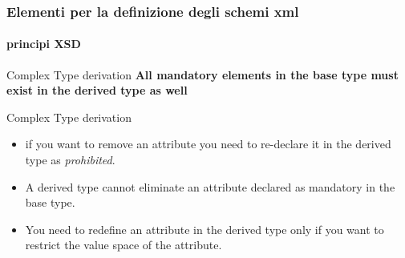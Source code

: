 \begin{frame}
	\frametitle{Elementi per la definizione degli schemi xml}
	\framesubtitle{principi XSD}
	\addtocounter{nframe}{1}

	\begin{block}{Complex Type derivation}
		\textbf{All mandatory elements in the base type must exist in the derived type as well}
	\end{block}

	\begin{block}{Complex Type derivation}
\begin{itemize}
	\item if you want to remove an attribute you need to re-declare it in the derived type as \textit{prohibited}.
	\item A derived type cannot eliminate an attribute declared as mandatory in the base type.
	\item You need to redefine an attribute in the derived type only if you want to restrict the value space of the attribute.
\end{itemize}
	\end{block}
\end{frame}





%
%





